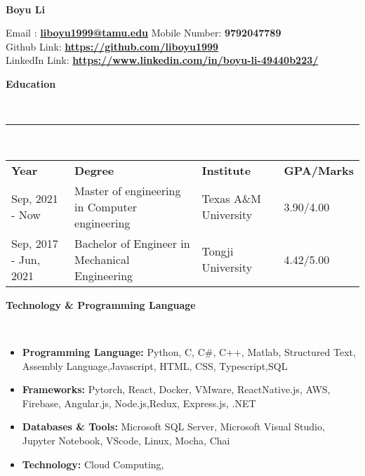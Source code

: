 \documentclass[a4paper,10pt]{article}
\newcommand{\lsep}{-0.5cm}
\newcommand{\resheading}[1]{{\small \colorbox{mygrey}{\begin{minipage}{0.975\textwidth}{\textbf{#1 \vphantom{p\^{E}}}}\end{minipage}}}}
\begin{document}
\hspace{0.5cm}\\[-0.2cm]
\begin{center}
\textbf{Boyu Li}   
\end{center}
\hspace{0.2in}Email : \textbf{\url{liboyu1999@tamu.edu}} \hfill Mobile Number: \textbf{9792047789}  \\
\indent Github Link: \textbf{\url{https://github.com/liboyu1999}}\\
\indent LinkedIn Link: \textbf{\url{https://www.linkedin.com/in/boyu-li-49440b223/}}\\
 
\resheading{\textbf{Education} }\\[\lsep]

\indent \rule{6.8in}{0.4pt}\\
\indent \begin{tabular}{ l @{\hskip 0.15in} l @{\hskip 0.15in} l @{\hskip 0.15in} l @{\hskip 0.15in} }
\noindent \textbf{Year} & \textbf{Degree} & \textbf{Institute} & \textbf{GPA/Marks}\\
Sep, 2021 - Now & Master of engineering in Computer engineering & Texas A\&M University & 3.90/4.00\\
Sep, 2017 - Jun, 2021 & Bachelor of Engineer in Mechanical Engineering & Tongji University & 4.42/5.00 \\
 
\end{tabular}

\resheading{\textbf{Technology \& Programming Language} }\\[\lsep]
\begin{itemize}
\setlength\itemsep{0em}
\item \textbf{Programming Language: }Python, C, C\#, C++, Matlab, Structured Text, Assembly Language,Javascript, HTML, CSS, Typescript,SQL
\item \textbf{Frameworks: }Pytorch, React, Docker, VMware, ReactNative.js, AWS, Firebase, Angular.js, Node.js,Redux, Express.js, .NET
\item \textbf{Databases \& Tools: } Microsoft SQL Server, Microsoft Visual Studio, Jupyter Notebook, VScode, Linux, Mocha, Chai
\item \textbf{Technology: } Cloud Computing, 
\end{itemize}
 
\end{document}
